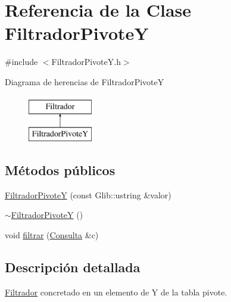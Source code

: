 \hypertarget{classFiltradorPivoteY}{\section{\-Referencia de la \-Clase \-Filtrador\-Pivote\-Y}
\label{classFiltradorPivoteY}
}


{\ttfamily \#include $<$\-Filtrador\-Pivote\-Y.\-h$>$}

\-Diagrama de herencias de \-Filtrador\-Pivote\-Y\begin{figure}[H]
\begin{center}
\leavevmode
\includegraphics[height=2.000000cm]{classFiltradorPivoteY}
\end{center}
\end{figure}
\subsection*{\-Métodos públicos}
\begin{DoxyCompactItemize}
\item 
\hyperlink{classFiltradorPivoteY_aee366ac39afd3070ee9922899c4b0175}{\-Filtrador\-Pivote\-Y} (const \-Glib\-::ustring \&valor)
\item 
\hyperlink{classFiltradorPivoteY_ac9bedc3d3f4176bd3b8dbe8cf522d596}{$\sim$\-Filtrador\-Pivote\-Y} ()
\item 
void \hyperlink{classFiltradorPivoteY_a66d31de7db52e27c91073a27fd53b835}{filtrar} (\hyperlink{classConsulta}{\-Consulta} \&c)
\end{DoxyCompactItemize}


\subsection{\-Descripción detallada}
\hyperlink{classFiltrador}{\-Filtrador} concretado en un elemento de \-Y de la tabla pivote. 

